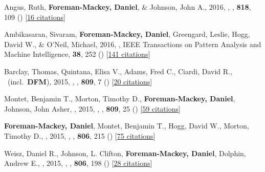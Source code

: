 \item[{\color{numcolor}\scriptsize15}] Angus, Ruth, \textbf{Foreman-Mackey, Daniel}, \& Johnson, John A., 2016, , \apj, \textbf{818}, 109 () [\href{http://adsabs.harvard.edu/abs/2016ApJ...818..109A}{16 citations}]

\item[{\color{numcolor}\scriptsize14}] Ambikasaran, Sivaram, \textbf{Foreman-Mackey, Daniel}, Greengard, Leslie, Hogg, David W., \& O'Neil, Michael, 2016, , IEEE Transactions on Pattern Analysis and Machine Intelligence, \textbf{38}, 252 () [\href{https://scholar.google.com/scholar?cites=4840899390891567426,9641158393712381489}{141 citations}]

\item[{\color{numcolor}\scriptsize13}] Barclay, Thomas, Quintana, Elisa V., Adams, Fred C., Ciardi, David R., \etal\ (incl.\ \textbf{DFM}), 2015, , \apj, \textbf{809}, 7 () [\href{http://adsabs.harvard.edu/abs/2015ApJ...809....7B}{20 citations}]

\item[{\color{numcolor}\scriptsize12}] Montet, Benjamin T., Morton, Timothy D., \textbf{Foreman-Mackey, Daniel}, Johnson, John Asher, \etal, 2015, , \apj, \textbf{809}, 25 () [\href{http://adsabs.harvard.edu/abs/2015ApJ...809...25M}{59 citations}]

\item[{\color{numcolor}\scriptsize11}] \textbf{Foreman-Mackey, Daniel}, Montet, Benjamin T., Hogg, David W., Morton, Timothy D., \etal, 2015, , \apj, \textbf{806}, 215 () [\href{http://adsabs.harvard.edu/abs/2015ApJ...806..215F}{75 citations}]

\item[{\color{numcolor}\scriptsize10}] Weisz, Daniel R., Johnson, L. Clifton, \textbf{Foreman-Mackey, Daniel}, Dolphin, Andrew E., \etal, 2015, , \apj, \textbf{806}, 198 () [\href{http://adsabs.harvard.edu/abs/2015ApJ...806..198W}{28 citations}]

